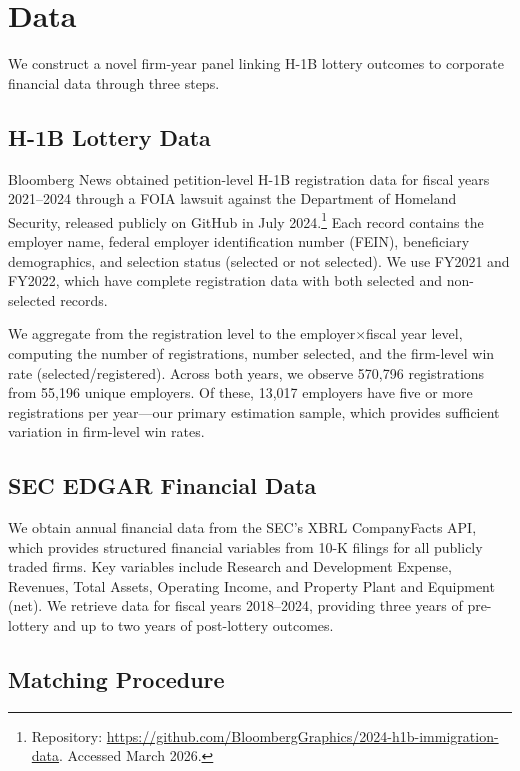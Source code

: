 \documentclass[12pt]{article}
\begin{document}
\section{Data}
\label{sec:data}

We construct a novel firm-year panel linking H-1B lottery outcomes to corporate financial data through three steps.

\subsection{H-1B Lottery Data}

Bloomberg News obtained petition-level H-1B registration data for fiscal years 2021--2024 through a FOIA lawsuit against the Department of Homeland Security, released publicly on GitHub in July 2024.\footnote{Repository: \url{https://github.com/BloombergGraphics/2024-h1b-immigration-data}. Accessed March 2026.} Each record contains the employer name, federal employer identification number (FEIN), beneficiary demographics, and selection status (selected or not selected). We use FY2021 and FY2022, which have complete registration data with both selected and non-selected records.

We aggregate from the registration level to the employer$\times$fiscal year level, computing the number of registrations, number selected, and the firm-level win rate (selected/registered). Across both years, we observe 570,796 registrations from 55,196 unique employers. Of these, 13,017 employers have five or more registrations per year---our primary estimation sample, which provides sufficient variation in firm-level win rates.

\subsection{SEC EDGAR Financial Data}

We obtain annual financial data from the SEC's XBRL CompanyFacts API, which provides structured financial variables from 10-K filings for all publicly traded firms. Key variables include Research and Development Expense, Revenues, Total Assets, Operating Income, and Property Plant and Equipment (net). We retrieve data for fiscal years 2018--2024, providing three years of pre-lottery and up to two years of post-lottery outcomes.

\subsection{Matching Procedure}
\end{document}
